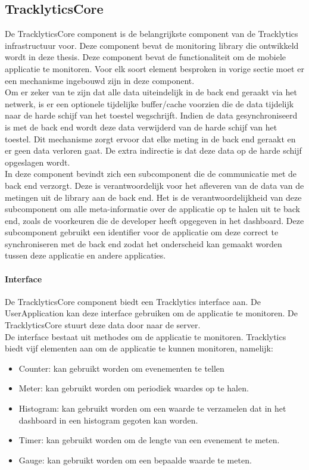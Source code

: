 \subsection{TracklyticsCore}
De TracklyticsCore component is de belangrijkste component van de Tracklytics infrastructuur voor. Deze component bevat de monitoring library die ontwikkeld wordt in deze thesis. Deze component bevat de functionaliteit om de mobiele applicatie te monitoren. Voor elk soort element besproken in vorige sectie moet er een mechanisme ingebouwd zijn in deze component. \\

Om er zeker van te zijn dat alle data uiteindelijk in de back end geraakt via het netwerk, is er een optionele tijdelijke buffer/cache voorzien die de data tijdelijk naar de harde schijf van het toestel wegschrijft. Indien de data gesynchroniseerd is met de back end wordt deze data verwijderd van de harde schijf van het toestel. Dit mechanisme zorgt ervoor dat elke meting in de back end geraakt en er geen data verloren gaat. De extra indirectie is dat deze data op de harde schijf opgeslagen wordt. \\

In deze component bevindt zich een subcomponent die de communicatie met de back end verzorgt. Deze is verantwoordelijk voor het afleveren van de data van de metingen uit de library aan de back end. Het is de verantwoordelijkheid van deze subcomponent om alle meta-informatie over de applicatie op te halen uit te back end, zoals de voorkeuren die de developer heeft opgegeven in het dashboard. Deze subcomponent gebruikt een identifier voor de applicatie om deze correct te synchroniseren met de back end zodat het onderscheid kan gemaakt worden tussen deze applicatie en andere applicaties. 


\paragraph{Interface}
De TracklyticsCore component biedt een Tracklytics interface aan. De UserApplication kan deze interface gebruiken om de applicatie te monitoren. De TracklyticsCore stuurt deze data door naar de server.\\

De interface bestaat uit methodes om de applicatie te monitoren. Tracklytics biedt vijf elementen aan om de applicatie te kunnen monitoren, namelijk:
\begin{itemize}
\item Counter: kan gebruikt worden om evenementen te tellen
\item Meter: kan gebruikt worden om periodiek waardes op te halen.
\item Histogram: kan gebruikt worden om een waarde te verzamelen dat in het dashboard in een histogram gegoten kan worden. 
\item Timer: kan gebruikt worden om de lengte van een evenement te meten.
\item Gauge: kan gebruikt worden om een bepaalde waarde te meten. 
\end{itemize}

